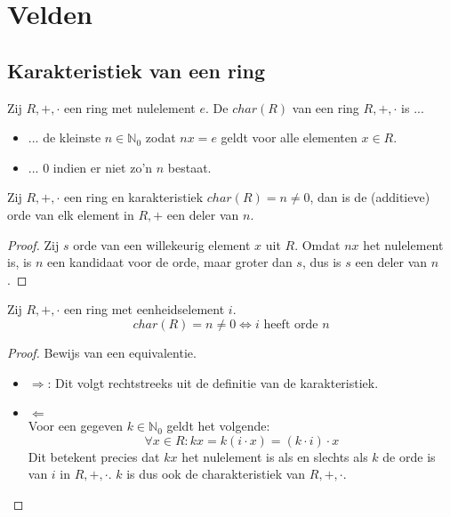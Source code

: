 \documentclass[main.tex]{subfiles}
\begin{document}
\chapter{Velden}
\label{cha:velden}

\section{Karakteristiek van een ring}
\label{sec:karakt-van-een}

\begin{de}
  Zij $R,+,\cdot$ een ring met nulelement $e$.
  De  $char(R)$ van een ring $R,+,\cdot$ is ...
  \begin{itemize}
  \item ... de kleinste $n\in \mathbb{N}_{0}$ zodat $nx=e$ geldt voor alle elementen $x\in R$.
  \item ... $0$ indien er niet zo'n $n$ bestaat.
  \end{itemize}
\end{de} 

\begin{ei}
  Zij $R,+,\cdot$ een ring  en karakteristiek $char(R) = n \neq 0$, dan is de (additieve) orde van elk element in $R,+$ een deler van $n$.

  \begin{proof}
    Zij $s$ orde van een willekeurig element $x$ uit $R$.
    Omdat $nx$ het nulelement is, is $n$ een kandidaat voor de orde, maar groter dan $s$, dus is $s$ een deler van $n$.
  \end{proof}
\end{ei}

\begin{st}
  Zij $R,+,\cdot$ een ring met eenheidselement $i$.
  \[ char(R) = n \neq 0 \Leftrightarrow i \text{ heeft orde } n \]

  \begin{proof}
    Bewijs van een equivalentie.
    \begin{itemize}
    \item $\Rightarrow$: Dit volgt rechtstreeks uit de definitie van de karakteristiek.
    \item $\Leftarrow$\\
      Voor een gegeven $k\in \mathbb{N}_{0}$ geldt het volgende:
      \[ \forall x \in R: kx = k(i\cdot x) = (k \cdot i) \cdot x \]
      Dit betekent precies dat $kx$ het nulelement is als en slechts als $k$ de orde is van $i$ in $R,+,\cdot$.
      $k$ is dus ook de charakteristiek van $R,+,\cdot$.
    \end{itemize}
  \end{proof}
\end{st}
\end{document}
